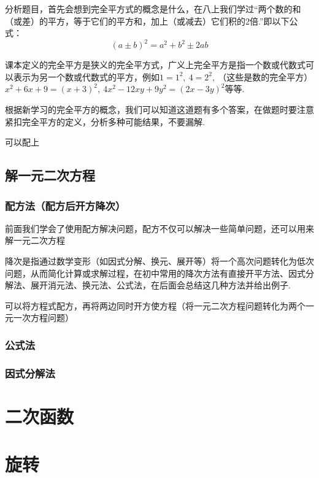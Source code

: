 \documentclass[lang=cn, 10pt, titlestyle=hang]{elegantbook}
\begin{document}
分析题目，首先会想到完全平方式的概念是什么，在八上我们学过“两个数的和（或差）的平方，等于它们的平方和，加上（或减去）它们积的2倍.”即以下公式：
$$
(a\pm b)^2 = a^2+b^2\pm 2ab
$$



课本定义的完全平方是狭义的完全平方式，广义上完全平方是指一个数或代数式可以表示为另一个数或代数式的平方，例如\( 1=1^2,\ 4=2^2,\ \)（这些是数的完全平方）\(x^2+6x+9=(x+3)^2,\ 4x^2-12xy+9y^2=(2x-3y)^2\)等等.



根据新学习的完全平方的概念，我们可以知道这道题有多个答案，在做题时要注意紧扣完全平方的定义，分析多种可能结果，不要漏解.
\begin{solution}
    可以配上
\end{solution}

\section{解一元二次方程}
\subsection{配方法（配方后开方降次）}
前面我们学会了使用配方解决问题，配方不仅可以解决一些简单问题，还可以用来解一元二次方程



降次是指通过数学变形（如因式分解、换元、展开等）将一个高次问题转化为低次问题，从而简化计算或求解过程，在初中常用的降次方法有直接开平方法、因式分解法、展开消元法、换元法、公式法，在后面会总结这几种方法并给出例子.



可以将方程式配方，再将两边同时开方使方程（将一元二次方程问题转化为两个一元一次方程问题）

\subsection{公式法}

\subsection{因式分解法}

\chapter{二次函数}

\chapter{旋转}
\end{document}
